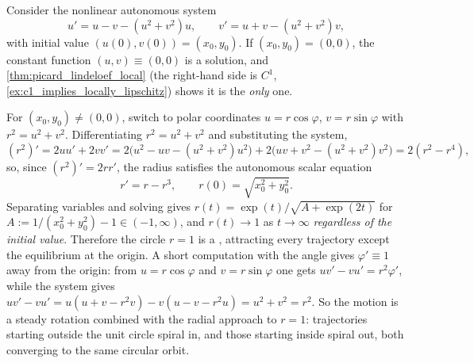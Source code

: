 \begin{example}
\label{ex:autonomous_limit_cycle}
Consider the nonlinear autonomous system
\[u' = u-v-(u^2+v^2)u, \qquad v' = u+v-(u^2+v^2)v,\]
with initial value $(u(0),v(0))=(x_0,y_0)$. If $(x_0,y_0)=(0,0)$, the constant function
$(u,v)\equiv(0,0)$ is a solution, and \cref{thm:picard_lindeloef_local} (the right-hand side is
$C^1$, \cref{ex:c1_implies_locally_lipschitz}) shows it is the \emph{only} one.

For $(x_0,y_0) \neq (0,0)$, switch to polar coordinates $u=r\cos\varphi$, $v=r\sin\varphi$ with
$r^2=u^2+v^2$. Differentiating $r^2=u^2+v^2$ and substituting the system,
\[(r^2)' = 2uu'+2vv' = 2\big(u^2-uv-(u^2+v^2)u^2\big) + 2\big(uv+v^2-(u^2+v^2)v^2\big)
  = 2(r^2-r^4),\]
so, since $(r^2)'=2rr'$, the radius satisfies the autonomous scalar equation
\[r' = r-r^3, \qquad r(0)=\sqrt{x_0^2+y_0^2}.\]
Separating variables and solving gives $r(t) = \exp(t)/\sqrt{A+\exp(2t)}$ for
$A := 1/(x_0^2+y_0^2)-1 \in (-1,\infty)$, and $r(t) \to 1$ as $t \to \infty$
\emph{regardless of the initial value}. Therefore the circle $r=1$ is a 
, attracting every trajectory except the equilibrium at the origin.
A short computation with the angle gives $\varphi'\equiv1$ away from the origin: from
$u = r\cos\varphi$ and $v = r\sin\varphi$ one gets $uv'-vu' = r^2\varphi'$, while the system
gives $uv'-vu' = u(u+v-r^2v)-v(u-v-r^2u) = u^2+v^2 = r^2$. So the motion is a steady
rotation combined with the radial approach to $r=1$: trajectories starting outside the unit
circle spiral in, and those starting inside spiral out, both converging to the same circular
orbit.
\begin{center}
\end{center}
\end{example}

